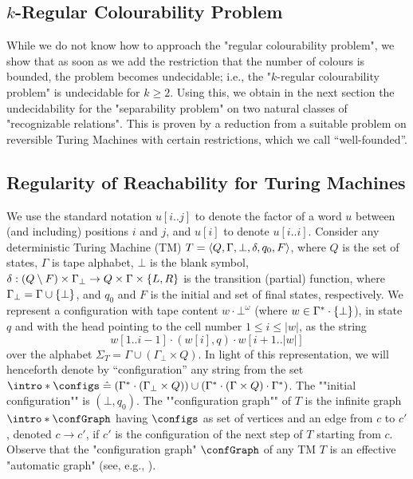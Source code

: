 \subsection{$k$-Regular Colourability Problem}

While we do not know how to approach the "regular colourability problem", we show that as soon as we add the restriction that the number of colours is bounded, the problem becomes undecidable; i.e., the "$k$-regular colourability problem" is undecidable for $k\geq 2$. Using this, we obtain in the next section 
the undecidability for the "separability problem" on two natural classes of 
"recognizable relations". This is proven by a reduction from a suitable problem on reversible 
Turing Machines with certain restrictions, which we call ``well-founded''.

\subsection{Regularity of Reachability for Turing Machines}
We use the standard notation $u[i..j]$ to denote the factor of a word $u$ between (and including) positions $i$ and $j$, and $u[i]$ to denote $u[i..i]$.
Consider any deterministic Turing Machine (TM) $T = \langle Q,\Gamma,\bot,\delta,q_0,F\rangle$, where $Q$ is the set of states, $\Gamma$ is tape alphabet, $\bot$ is the blank symbol, $\delta: (Q \setminus F) \times \Gamma_\bot \to Q \times \Gamma \times \{L,R\}$ is the transition (partial) function, where $\Gamma_\bot = \Gamma \cup \{\bot\}$, and $q_0$ and $F$ is the initial and set of final states, respectively.
%
We represent a configuration with tape content $w \cdot \bot^\omega$ (where $w \in \Gamma^* \cdot \{\bot\}$), in state $q$ and with the head pointing to the cell number $1 \leq i \leq |w|$, as the string
\[
   w[1..i-1] \cdot (w[i],q) \cdot w[i+1..|w|] 
\]
over the alphabet $\Sigma_T = \Gamma \cup (\Gamma_\bot \times Q)$.
\AP In light of this representation, we will henceforth denote by ``configuration'' any string from the set  $\intro*\configs \defeq (\Gamma^* \cdot (\Gamma_\bot \times Q)) \cup  (\Gamma^* \cdot (\Gamma \times Q) \cdot \Gamma^*)$. The ""initial configuration"" is $(\bot,q_0)$.
\AP The ""configuration graph"" of $T$ is the infinite graph $\intro*\confGraph$ having $\configs$ as set of vertices and an edge from $c$ to $c'$, denoted $c \rightarrow c'$, if $c'$ is the configuration of the next step of $T$ starting from $c$. Observe that the "configuration graph" $\confGraph$ of any TM $T$ is an effective "automatic graph" (see, e.g., \cite{KL10}).

